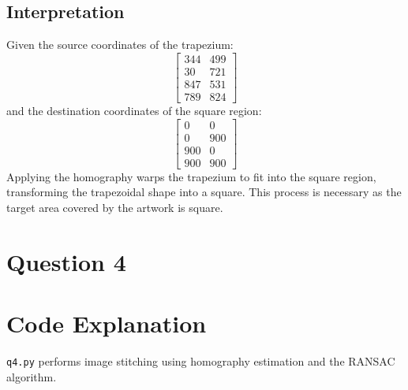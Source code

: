 \documentclass{article}
\begin{document}
\subsection{Interpretation}
Given the source coordinates of the trapezium:
\[
\begin{bmatrix}
344 & 499 \\
30 & 721 \\
847 & 531 \\
789 & 824
\end{bmatrix}
\]
and the destination coordinates of the square region:
\[
\begin{bmatrix}
0 & 0 \\
0 & 900 \\
900 & 0 \\
900 & 900
\end{bmatrix}
\]
Applying the homography warps the trapezium to fit into the square region, transforming the trapezoidal shape into a square. This process is necessary as the target area covered by the artwork is square.

\section{Question 4}
\section*{Code Explanation}

\texttt{q4.py} performs image stitching using homography estimation and the RANSAC algorithm.
\end{document}
